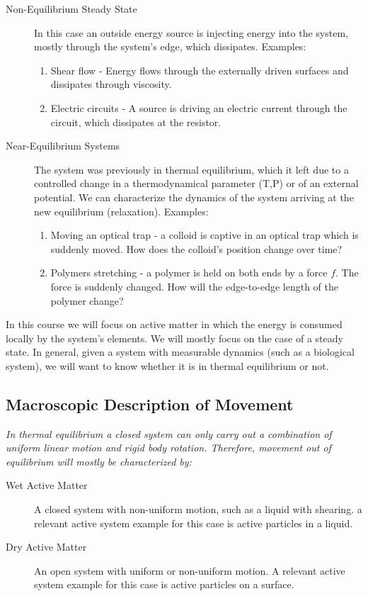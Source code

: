 \begin{description}
	\item[Non-Equilibrium Steady State] In this case an outside energy source is injecting energy into the system, mostly through the system's edge, which dissipates. Examples: \begin{enumerate}
		\item Shear flow - Energy flows through the externally driven surfaces and dissipates through viscosity.
		\item Electric circuits - A source is driving an electric current through the circuit, which dissipates at the resistor.
	\end{enumerate}
	\item[Near-Equilibrium Systems] The system was previously in thermal equilibrium, which it left due to a controlled change in a thermodynamical parameter (T,P) or of an external potential. We can characterize the dynamics of the system arriving at the new equilibrium (relaxation). Examples: \begin{enumerate}
		\item Moving an optical trap - a colloid is captive in an optical trap which is suddenly moved. How does the colloid's position change over time?
		\item Polymers stretching - a polymer is held on both ends by a force $f$. The force is suddenly changed. How will the edge-to-edge length of the polymer change?
	\end{enumerate}
\end{description}

In this course we will focus on active matter in which the energy is consumed locally by the system's elements. We will mostly focus on the case of a steady state. In general, given a system with measurable dynamics (such as a biological system), we will want to know whether it is in thermal equilibrium or not.

\subsection{Macroscopic Description of Movement}\label{macro_movement}

\emph{In thermal equilibrium a closed system can only carry out a combination of uniform linear motion and rigid body rotation. Therefore, movement out of equilibrium will mostly be characterized by:}

\begin{description}
	\item[Wet Active Matter] A closed system with non-uniform motion, such as a liquid with shearing. a relevant active system example for this case is active particles in a liquid.
	\item[Dry Active Matter] An open system with uniform or non-uniform motion. A relevant active system example for this case is active particles on a surface.
\end{description}

